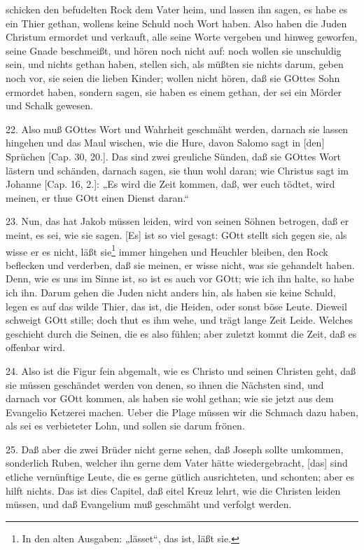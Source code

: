 schicken den befudelten Rock dem Vater heim, und lassen ihn sagen, es habe es ein Thier gethan, wollens keine Schuld noch Wort haben. Also haben die Juden Christum ermordet und verkauft, alle seine Worte vergeben und hinweg geworfen, seine Gnade beschmeißt, und hören noch nicht auf: noch wollen sie unschuldig sein, und nichts gethan haben, stellen sich, als müßten sie nichts darum, geben noch vor, sie seien die lieben Kinder; wollen nicht hören, daß sie GOttes Sohn ermordet haben, sondern sagen, sie haben es einem gethan, der sei ein Mörder und Schalk gewesen.

22. Also muß GOttes Wort und Wahrheit geschmäht werden, darnach sie lassen hingehen und das Maul wischen, wie die Hure, davon Salomo sagt in [den] Sprüchen [Cap. 30, 20.]. Das sind zwei greuliche Sünden, daß sie GOttes Wort lästern und schänden, darnach sagen, sie thun wohl daran; wie Christus sagt im Johanne [Cap. 16, 2.]: „Es wird die Zeit kommen, daß, wer euch tödtet, wird meinen, er thue GOtt einen Dienst daran.“

23. Nun, das hat Jakob müssen leiden, wird von seinen Söhnen betrogen, daß er meint, es sei, wie sie sagen. [Es] ist so viel gesagt: GOtt stellt sich gegen sie, als wisse er es nicht, läßt sie\footnote{In den alten Ausgaben: „lässet“, das ist, läßt sie.} immer hingehen und Heuchler bleiben, den Rock beflecken und verderben, daß sie meinen, er wisse nicht, was sie gehandelt haben. Denn, wie es uns im Sinne ist, so ist es auch vor GOtt; wie ich ihn halte, so habe ich ihn. Darum gehen die Juden nicht anders hin, als haben sie keine Schuld, legen es auf das wilde Thier, das ist, die Heiden, oder sonst böse Leute. Dieweil schweigt GOtt stille; doch thut es ihm wehe, und trägt lange Zeit Leide. Welches geschieht durch die Seinen, die es also fühlen; aber zuletzt kommt die Zeit, daß es offenbar wird.

24. Also ist die Figur fein abgemalt, wie es Christo und seinen Christen geht, daß sie müssen geschändet werden von denen, so ihnen die Nächsten sind, und darnach vor GOtt kommen, als haben sie wohl gethan; wie sie jetzt aus dem Evangelio Ketzerei machen. Ueber die Plage müssen wir die Schmach dazu haben, als sei es verbieteter Lohn, und sollen sie darum frönen.

25. Daß aber die zwei Brüder nicht gerne sehen, daß Joseph sollte umkommen, sonderlich Ruben, welcher ihn gerne dem Vater hätte wiedergebracht, [das] sind etliche vernünftige Leute, die es gerne gütlich ausrichteten, und schonten; aber es hilft nichts. Das ist dies Capitel, daß eitel Kreuz lehrt, wie die Christen leiden müssen, und daß Evangelium muß geschmäht und verfolgt werden.

